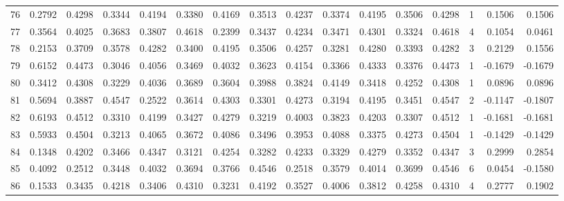 \begin{tabular}{lrrrrrrrrrrrrrrr}
76  &      0.2792 &  0.4298 &  0.3344 &  0.4194 &  0.3380 &  0.4169 &  0.3513 &  0.4237 &  0.3374 &  0.4195 &   0.3506 &     0.4298 &      1 &                    0.1506 &                     0.1506 \\
77  &      0.3564 &  0.4025 &  0.3683 &  0.3807 &  0.4618 &  0.2399 &  0.3437 &  0.4234 &  0.3471 &  0.4301 &   0.3324 &     0.4618 &      4 &                    0.1054 &                     0.0461 \\
78  &      0.2153 &  0.3709 &  0.3578 &  0.4282 &  0.3400 &  0.4195 &  0.3506 &  0.4257 &  0.3281 &  0.4280 &   0.3393 &     0.4282 &      3 &                    0.2129 &                     0.1556 \\
79  &      0.6152 &  0.4473 &  0.3046 &  0.4056 &  0.3469 &  0.4032 &  0.3623 &  0.4154 &  0.3366 &  0.4333 &   0.3376 &     0.4473 &      1 &                   -0.1679 &                    -0.1679 \\
80  &      0.3412 &  0.4308 &  0.3229 &  0.4036 &  0.3689 &  0.3604 &  0.3988 &  0.3824 &  0.4149 &  0.3418 &   0.4252 &     0.4308 &      1 &                    0.0896 &                     0.0896 \\
81  &      0.5694 &  0.3887 &  0.4547 &  0.2522 &  0.3614 &  0.4303 &  0.3301 &  0.4273 &  0.3194 &  0.4195 &   0.3451 &     0.4547 &      2 &                   -0.1147 &                    -0.1807 \\
82  &      0.6193 &  0.4512 &  0.3310 &  0.4199 &  0.3427 &  0.4279 &  0.3219 &  0.4003 &  0.3823 &  0.4203 &   0.3307 &     0.4512 &      1 &                   -0.1681 &                    -0.1681 \\
83  &      0.5933 &  0.4504 &  0.3213 &  0.4065 &  0.3672 &  0.4086 &  0.3496 &  0.3953 &  0.4088 &  0.3375 &   0.4273 &     0.4504 &      1 &                   -0.1429 &                    -0.1429 \\
84  &      0.1348 &  0.4202 &  0.3466 &  0.4347 &  0.3121 &  0.4254 &  0.3282 &  0.4233 &  0.3329 &  0.4279 &   0.3352 &     0.4347 &      3 &                    0.2999 &                     0.2854 \\
85  &      0.4092 &  0.2512 &  0.3448 &  0.4032 &  0.3694 &  0.3766 &  0.4546 &  0.2518 &  0.3579 &  0.4014 &   0.3699 &     0.4546 &      6 &                    0.0454 &                    -0.1580 \\
86  &      0.1533 &  0.3435 &  0.4218 &  0.3406 &  0.4310 &  0.3231 &  0.4192 &  0.3527 &  0.4006 &  0.3812 &   0.4258 &     0.4310 &      4 &                    0.2777 &                     0.1902 \\

\end{tabular}
